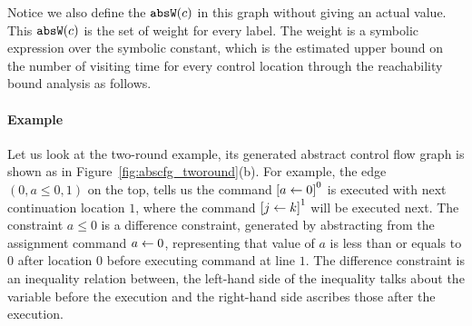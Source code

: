 Notice we also define the $\mathtt{abs}{\mathtt{W}}(c)$ in this graph without giving an actual value.
This $\mathtt{abs}{\mathtt{W}}(c)$ is the set of weight for every 
label. The weight is a symbolic expression over the symbolic constant, 
which is the estimated upper bound on the number of visiting time for every control location
through the reachability bound analysis as follows.
%
%
\paragraph*{Example}
%
Let us look at the two-round example, its generated abstract control flow graph is shown as in Figure~\ref{fig:abscfg_tworound}(b).
For example, the edge $(0, a \leq 0, 1)$ on the top, tells us the command 
$\clabel{\assign{a}{0}}^0$ is executed with next continuation location $1$,
where the 
command $\clabel{\assign{j}{k}}^1$ will be executed next.
The constraint $a \leq 0$ is a difference constraint, generated by abstracting from the assignment command $\mathrel{ a \leftarrow 0 }$,
representing that value of $a$ is less than or equals to $0$ after 
location $0$ before executing command at line $1$. The difference constraint is an inequality relation between, the left-hand side of the inequality talks about the variable before the execution and the right-hand side ascribes those after the execution. 
